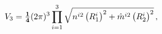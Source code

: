 \begin{equation}
V_3 = {\bf \textstyle{1\over 4}} (2 \pi)^3 \prod_{i=1}^3 \sqrt{n^{i2} \left(R_1^i\right)^2
+ \hat{m}^{i2} \left(R_2^i\right)^2}\, ,\label{v3}
\end{equation}


